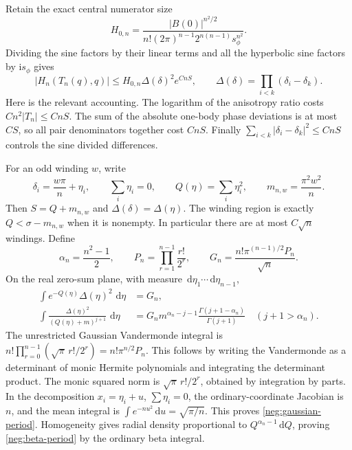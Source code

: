 \documentclass[11pt]{article}
\numberwithin{equation}{section}
\theoremstyle{definition}
\newcommand{\ii}{\mathrm i}
\newcommand{\dd}{\,\mathrm d}
\begin{document}
Retain the exact central numerator size
\begin{equation}
 H_{0,n}=
 \frac{|B(0)|^{n^2/2}}
 {n!(2\pi)^{n-1}2^{n(n-1)}s_\phi^{n^2}} .
 \label{neg:H0}
\end{equation}
Dividing the sine factors by their linear terms and all the
hyperbolic sine factors by \(\ii s_\phi\) gives
\begin{equation}
 |H_n(T_n(q),q)|
 \le H_{0,n}\Delta(\delta)^2e^{CnS},
 \qquad
 \Delta(\delta)=\prod_{i<k}(\delta_i-\delta_k).
 \label{neg:pole-density-upper}
\end{equation}
Here is the relevant accounting.  The logarithm of the anisotropy
ratio costs \(Cn^2|T_n|\le CnS\).  The sum of the absolute
one-body phase deviations is at most \(CS\), so all pair
denominators together cost \(CnS\).  Finally
\(\sum_{i<k}|\delta_i-\delta_k|^2\le CnS\) controls the sine
divided differences.

For an odd winding \(w\), write
\begin{equation}
 \delta_i=\frac{w\pi}{n}+\eta_i,\qquad
 \sum_i\eta_i=0,\qquad
 Q(\eta)=\sum_i\eta_i^2,\qquad
 m_{n,w}=\frac{\pi^2w^2}{n}.
 \label{neg:winding}
\end{equation}
Then \(S=Q+m_{n,w}\) and \(\Delta(\delta)=\Delta(\eta)\).
The winding region is exactly \(Q<\sigma-m_{n,w}\) when it is
nonempty.  In particular there are at most \(C\sqrt n\) windings.
Define
\begin{equation}
 \alpha_n=\frac{n^2-1}{2},\qquad
 P_n=\prod_{r=1}^{n-1}\frac{r!}{2^r},\qquad
 G_n=\frac{n!\pi^{(n-1)/2}P_n}{\sqrt n}.
 \label{neg:gaussian-constant}
\end{equation}
On the real zero-sum plane, with measure
\(\dd\eta_1\cdots\dd\eta_{n-1}\),
\begin{align}
 \int e^{-Q(\eta)}\Delta(\eta)^2\,\dd\eta&=G_n,
 \label{neg:gaussian-period}\\
 \int\frac{\Delta(\eta)^2}{(Q(\eta)+m)^{j+1}}\,\dd\eta
 &=G_n m^{\alpha_n-j-1}
       \frac{\Gamma(j+1-\alpha_n)}{\Gamma(j+1)}
       \quad(j+1>\alpha_n).
 \label{neg:beta-period}
\end{align}
The unrestricted Gaussian Vandermonde integral is
\(n!\prod_{r=0}^{n-1}(\sqrt\pi\,r!/2^r)
 =n!\pi^{n/2}P_n\).
This follows by writing the Vandermonde as a determinant of monic
Hermite polynomials and integrating the determinant product.
The monic squared norm is \(\sqrt\pi\,r!/2^r\), obtained by
integration by parts.  In the decomposition
\(x_i=\eta_i+u\), \(\sum\eta_i=0\), the ordinary-coordinate
Jacobian is \(n\), and the mean integral is
\(\int e^{-nu^2}\dd u=\sqrt{\pi/n}\).  This proves
\eqref{neg:gaussian-period}.  Homogeneity gives radial density
proportional to \(Q^{\alpha_n-1}\dd Q\), proving
\eqref{neg:beta-period} by the ordinary beta integral.
\end{document}
